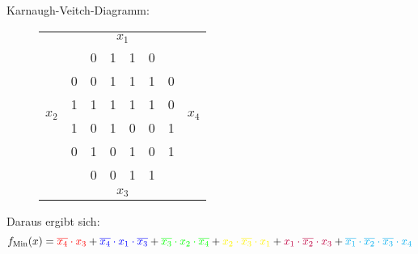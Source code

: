 \documentclass[DIN, pagenumber=false, fontsize=11pt, parskip=half]{scrartcl}
\begin{document}
\begin{enumerate}[label = (\alph*)]
            Karnaugh-Veitch-Diagramm:
            \begin{figure}[H]
                \centering
                \begin{tabular}{cc|cccc|cc}
                    & &  & \multicolumn{2}{c}{$x_1$} & & \\
                    & & 0 & 1 & 1 & 0\\
                    \midrule
                    \multirow{4}{*}{$x_2$} & 0 & 0 & \cellcolor{blue!25}1 & \cellcolor{purple!25}1 & \cellcolor{red!25}1 & 0 &\multirow{4}{*}{$x_4$}\\
                     & 1 & \cellcolor{green!25}1 & \cellcolor{gray!25}1 & \cellcolor{red!25}1 & \cellcolor{red!25}1 & 0\\
                     & 1 & 0 & \cellcolor{yellow!25}1 & 0 & 0 & 1\\
                     & 0 & \cellcolor{cyan!25}1 & 0 & \cellcolor{purple!25}1 & 0 & 1\\
                    \midrule
                    & & 0 & 0 & 1 & 1\\
                    & &  & \multicolumn{2}{c}{$x_3$} & & \\
                \end{tabular}
            \end{figure}
            Daraus ergibt sich:
            \begin{equation*}
                f_\text{Min}(x) = \textcolor{red}{\overline{x_4}\cdot x_3} + 
                \textcolor{blue}{\overline{x_4}\cdot x_1 \cdot \overline{x_3}} + 
                \textcolor{green}{\overline{x_3} \cdot x_2 \cdot \overline{x_4}}+
                \textcolor{yellow}{x_2 \cdot \overline{x_3} \cdot x_1}+
                \textcolor{purple}{x_1 \cdot \overline{x_2} \cdot x_3}+
                \textcolor{cyan}{\overline{x_1} \cdot \overline{x_2} \cdot \overline{x_3} \cdot x_4}
            \end{equation*}
    \end{enumerate}
\end{document}
